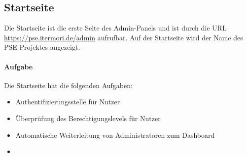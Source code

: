 \subsection{Startseite}

Die Startseite ist die erste Seite des Admin-Panels und ist durch die URL \href{https://pse.itermori.de/admin}{https://pse.itermori.de/admin} aufrufbar.
Auf der Startseite wird der Name des PSE-Projektes angezeigt. \\

\paragraph{Aufgabe}
Die Startseite hat die folgenden Aufgaben:

\begin{itemize}
    \item Authentifizierungsstelle für Nutzer
    \item Überprüfung des Berechtigungslevels für Nutzer
    \item Automatische Weiterleitung von Administratoren zum Dashboard
    \item 
\end{itemize}